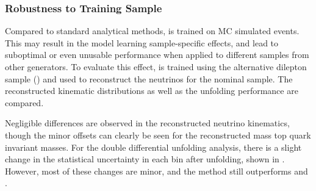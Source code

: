 \subsubsection{Robustness to Training Sample}

Compared to standard analytical methods, \vflows is trained on MC simulated events.
This may result in the model learning sample-specific effects, and lead to suboptimal or even unusable performance when applied to different samples from other generators.
To evaluate this effect, \vvflows is trained using the alternative \ttbar dilepton sample (\vvflowsPy) and used to reconstruct the neutrinos for the nominal \ttbar sample.
The reconstructed kinematic distributions as well as the unfolding performance are compared.

Negligible differences are observed in the reconstructed neutrino kinematics, though the minor offsets can clearly be seen for the reconstructed \Wboson mass top quark invariant masses.
For the double differential unfolding analysis, there is a slight change in the statistical uncertainty in each bin after unfolding, shown in .
However, most of these changes are minor, and the method still outperforms \vweight and \ellipse.

